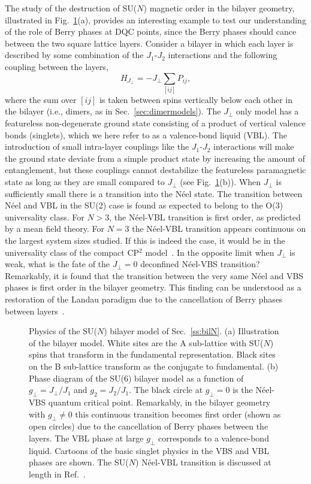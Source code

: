 \documentclass[range]{ar2e}
\begin{document}
The study of the destruction of SU($N$) magnetic order in the bilayer geometry, illustrated in Fig.~\ref{fig:pd_bil}(a), provides an interesting 
example to test our understanding of the role of Berry phases at DQC points, since the Berry phases should cance between the two square lattice layers. 
Consider a bilayer in which each layer is described by some combination of the $J_1$-$J_2$ interactions and the following coupling between the layers,
\begin{equation}
 H_{J_\perp} = -J_\perp \sum_{[ij]} P_{ij},
\end{equation}
where the sum over $[ij]$ is taken between spins vertically below each other in the bilayer (i.e., dimers, as in Sec.~\ref{sec:dimermodels}). 
The $J_\perp$ only model has a featureless non-degenerate ground state consisting of a product of vertical valence bonds (singlets), which we here
refer to as a valence-bond liquid (VBL). The introduction of small intra-layer couplings like the $J_1$-$J_2$ interactions will make the 
ground state deviate from a simple product state by increasing the amount of entanglement, but these couplings  cannot destabilize the featureless paramagnetic
state as long as they are small compared to $J_\perp$ (see Fig.~\ref{fig:pd_bil}(b)). When $J_\perp$ is sufficiently small there is a transition into the N\'eel state. The transition between N\'eel and VBL in the SU(2) case is found as expected to belong to the O(3) universality class. For $N>3$, the N\'eel-VBL transition is first order, as predicted by a mean field theory. For $N=3$ the N\'eel-VBL transition appears continuous on the largest system sizes studied. If this is indeed the case, it would be in the universality class of the compact CP$^2$ model~\cite{nahum2011:loops}.  In the opposite limit when $J_\perp$ is weak, what is the fate of the $J_\perp=0$ deconfined N\'eel-VBS transition? 
Remarkably, it is found that the transition between the very same N\'eel and VBS phases is first order in the bilayer geometry. This finding can be understood as a restoration of the Landau paradigm due to the cancellation of Berry phases between layers~\cite{kaul2012:sun_bil}.



\begin{figure}
\centerline{}
  \caption{ \label{fig:pd_bil}  Physics of the SU($N$) bilayer model  of Sec.~\ref{ss:bilN}.  (a) Illustration of the bilayer model. White sites are the A sub-lattice with SU($N$) spins that transform in the fundamental representation. Black sites on the B sub-lattice transform as the conjugate to fundamental. (b) Phase diagram of the
    SU($6$) bilayer model as a function of $g_\perp =J_\perp/J_1$ and $g_2=J_2/J_1$. The black circle at $g_\perp=0$ is the N\'eel-VBS quantum critical point. Remarkably, in the bilayer geometry with $g_\perp\neq 0$ this continuous transition becomes first order (shown as open circles) due to the cancellation of Berry phases between the layers. The VBL phase at large $g_\perp$ corresponds to a valence-bond liquid. Cartoons of the basic singlet physics in the VBS and VBL phases are shown. The SU($N$) N\'eel-VBL transition is discussed at length in Ref.~\cite{kaul2012:sun_bil}.}
\end{figure}
\end{document}
